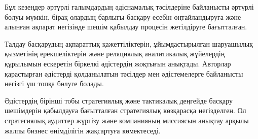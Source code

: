 \begin{multicols}{2}
Бұл кезеңдер әртүрлі ғалымдардың әдіснамалық тәсілдеріне байланысты
әртүрлі болуы мүмкін, бірақ олардың барлығы басқару есебін
оңтайландыруға және алынған ақпарат негізінде шешім қабылдау процесін
жетілдіруге бағытталған.

Талдау басқарудың ақпараттық қажеттіліктерін, ұйымдастырылған шаруашылық
қызметінің ерекшеліктерін және реляциялық аналитикалық жүйелердің
құрылымын ескеретін біркелкі әдістердің жоқтығын анықтады. Авторлар
қарастырған әдістерді қолданылатын тәсілдер мен әдістемелерге байланысты
негізгі үш топқа бөлуге болады.

Әдістердің бірінші тобы стратегиялық және тактикалық деңгейде басқару
шешімдерін қабылдауға бағытталған стратегиялық көзқарасқа негізделген.
Ол стратегиялық аудиттер жүргізу және компанияның миссиясын анықтау
арқылы жалпы бизнес өнімділігін жақсартуға көмектеседі.

\end{multicols}

